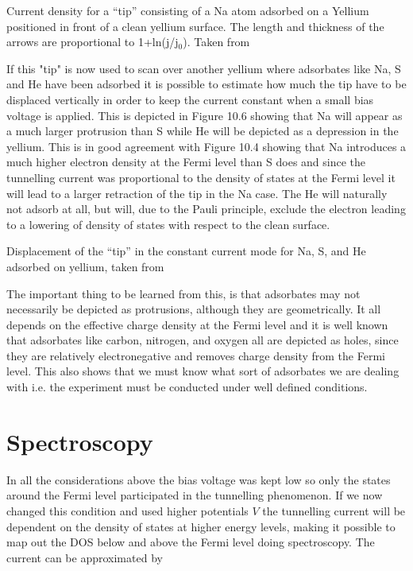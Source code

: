 \vspace{1cm}  

\vspace*{8cm}

  Current density for a ``tip'' consisting of a Na atom adsorbed on a Yellium positioned in front of a clean yellium surface. The length and thickness of the arrows are proportional to 1+ln(j/j$_0$). Taken from \cite{Lang} 

\vspace{1cm}

If this "tip" is now used to scan over another yellium where adsorbates like Na, S and He have been adsorbed it is possible to estimate how much the tip have to be displaced vertically in order to keep the current constant when a small bias voltage is applied. This is depicted in Figure 10.6 showing that Na will appear as a much larger protrusion than S while He will be depicted as a depression in the yellium. This is in good agreement with Figure 10.4 showing that Na introduces a much higher electron density at the Fermi level than  S does and since the tunnelling current was proportional to the density of states at the Fermi level it will lead to a larger retraction of the tip in the Na case. The He will naturally not adsorb at all, but will, due to the Pauli principle, exclude the electron leading to a lowering of density of states with respect to the clean surface. 

\vspace*{8cm}

 Displacement of the ``tip'' in the  constant current mode for Na, S, and He adsorbed on yellium, taken from \cite{Lang}

\vspace{1cm}

The important thing to be learned from this, is that adsorbates may not necessarily be depicted as protrusions, although they are geometrically. It all depends on the effective charge density at the Fermi level and it is well known that adsorbates like carbon, nitrogen, and  oxygen all are depicted as holes, since they are relatively electronegative and removes charge density from the Fermi level. This also shows that we must know what sort of adsorbates we are dealing with i.e. the experiment must be conducted under well defined conditions.

\section{Spectroscopy}
In all the considerations above the bias voltage was kept low so only the states around the Fermi level participated in the tunnelling phenomenon. If we now changed this condition and used higher potentials $V$ the tunnelling current will be dependent on the density of states at higher energy levels, making it possible to map out the DOS below and above the Fermi level doing spectroscopy. The current can be approximated by

